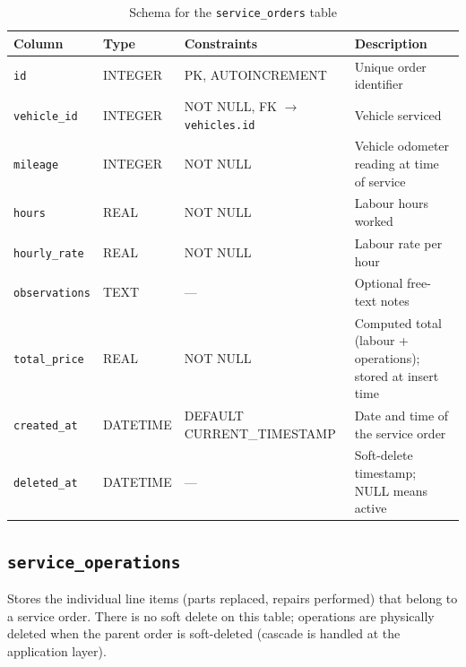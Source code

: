\documentclass[12pt, a4paper]{report}
\begin{document}
	\begin{table}[H]
		\centering
		\begin{tabularx}{\textwidth}{l l l X}
			\toprule
			\textbf{Column}      & \textbf{Type}   & \textbf{Constraints}   & \textbf{Description} \\
			\midrule
			\texttt{id}           & INTEGER & PK, AUTOINCREMENT      & Unique order identifier \\
			\texttt{vehicle\_id}  & INTEGER & NOT NULL, FK $\rightarrow$ \texttt{vehicles.id} & Vehicle serviced \\
			\texttt{mileage}      & INTEGER & NOT NULL               & Vehicle odometer reading at time of service \\
			\texttt{hours}        & REAL    & NOT NULL               & Labour hours worked \\
			\texttt{hourly\_rate}  & REAL    & NOT NULL               & Labour rate per hour \\
			\texttt{observations} & TEXT    & ---                    & Optional free-text notes \\
			\texttt{total\_price}  & REAL    & NOT NULL               & Computed total (labour + operations); stored at insert time \\
			\texttt{created\_at}  & DATETIME & DEFAULT CURRENT\_TIMESTAMP & Date and time of the service order \\
			\texttt{deleted\_at}  & DATETIME & ---                   & Soft-delete timestamp; NULL means active \\
			\bottomrule
		\end{tabularx}
		\caption{Schema for the \texttt{service\_orders} table}
		\label{tab:service_orders}
	\end{table}

	\subsection{\texttt{service\_operations}}
	Stores the individual line items (parts replaced, repairs performed)
	that belong to a service order. There is no soft delete on this table;
	operations are physically deleted when the parent order is soft-deleted
	(cascade is handled at the application layer).
\end{document}

